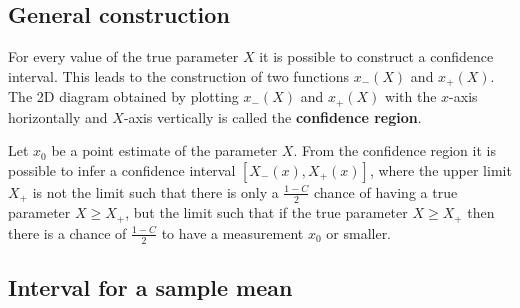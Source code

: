 

\subsection{General construction}

    For every value of the true parameter $X$ it is possible to construct a confidence interval. This leads to the construction of two functions $x_-(X)$ and $x_+(X)$. The 2D diagram obtained by plotting $x_-(X)$ and $x_+(X)$ with the $x$-axis horizontally and $X$-axis vertically is called the \textbf{confidence region}.
    \begin{method}
        Let $x_0$ be a point estimate of the parameter $X$. From the confidence region it is possible to infer a confidence interval $[X_-(x),X_+(x)]$, where the upper limit $X_+$ is not the limit such that there is only a $\frac{1-C}{2}$ chance of having a true parameter $X\geq X_+$, but the limit such that if the true parameter $X\geq X_+$ then there is a chance of $\frac{1-C}{2}$ to have a measurement $x_0$ or smaller.
    \end{method}

\subsection{Interval for a sample mean}

